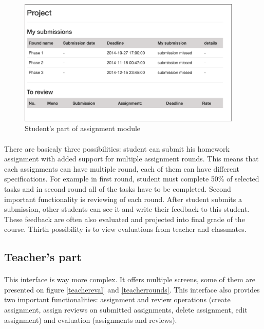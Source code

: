 \begin{figure}[h]
    \centering
    \includegraphics[width=0.95\textwidth]{images/assstudent.png}
    \caption{Student's part of assignment module}
    \label{assstudent}
\end{figure}

\paragraph{}
There are basicaly three possibilities: student can submit his homework assignment with added support for multiple assignment rounds. This means that each assignments can have multiple round, each of them can have different specifications. For example in first round, student must complete 50\% of selected tasks and in second round all of the tasks have to be completed. Second important functionality is reviewing of each round. After student submits a submission, other students can see it and write their feedback to this student. These feedback are often also evaluated and projected into final grade of the course. Thirth possibility is to view evaluations from teacher and classmates.

\subsection{Teacher's part}
\paragraph{}
This interface is way more complex. It offers multiple screens, some of them are presented on figure \ref{teachereval} and \ref{teacherrounds}. This interface also provides two important functionalities: assignment and review operations (create assignment, assign reviews on submitted assignments, delete assignment, edit assignment) and evaluation (assignments and reviews).



